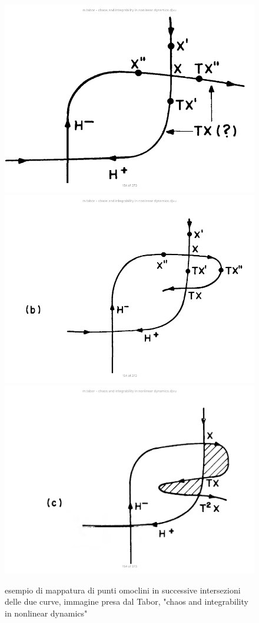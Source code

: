 \documentclass[a4paper,12pt]{article}
\theoremstyle{plain}
\theoremstyle{definition}
\theoremstyle{remark}
\begin{document}
\begin{figure}[h]
\centering

\includegraphics[scale=0.2]{Tabor1}
\includegraphics[scale=0.26]{Tabor2}
\includegraphics[scale=0.5]{Tabor3}

\caption{esempio di mappatura di punti omoclini in successive intersezioni delle due curve, immagine presa dal Tabor, "chaos and integrability in nonlinear dynamics"}
\label{osc}
\end{figure}
\end{document}
